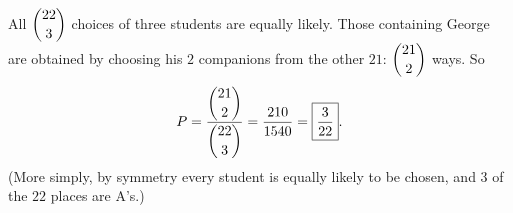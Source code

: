 All $\dbinom{22}{3}$ choices of three students are equally likely. Those containing George are obtained by choosing his $2$ companions from the other $21$: $\dbinom{21}{2}$ ways. So
\[
P=\dfrac{\dbinom{21}{2}}{\dbinom{22}{3}}=\dfrac{210}{1540}=\boxed{\dfrac{3}{22}}.
\]
(More simply, by symmetry every student is equally likely to be chosen, and $3$ of the $22$ places are A's.)
